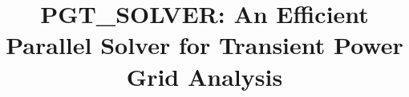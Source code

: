 \documentclass[conference]{IEEEtran}
\begin{document}
\title{PGT\_SOLVER: An Efficient Parallel Solver for Transient Power Grid Analysis}
\maketitle









\end{document}
